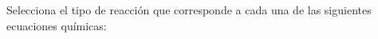 Selecciona el tipo de reacción que corresponde a cada una de las siguientes ecuaciones químicas:

\begin{parts}
    \part 
    \part 
    \part 
    \part 
    \part 
    \part 
    \part 
    \part 
    \part 
    \part 
\end{parts}